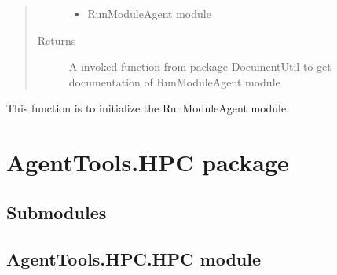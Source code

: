 \documentclass[letterpaper,10pt,english]{sphinxmanual}
\begin{document}
\begin{fulllineitems}
\begin{fulllineitems}
\begin{quote}
\begin{description}
\begin{itemize}
\item {} 
 \textendash{} RunModuleAgent module

\end{itemize}

\item[{Returns}] \leavevmode
A invoked function from package DocumentUtil to get documentation of RunModuleAgent module

\end{description}\end{quote}

\end{fulllineitems}


\end{fulllineitems}


\begin{fulllineitems}
\label{\detokenize{AgentTools.GenericModelAgent:AgentTools.GenericModelAgent.RunModuleAgent.initialize}}
This function is to initialize the RunModuleAgent module

\end{fulllineitems}




\section{AgentTools.HPC package}
\label{\detokenize{AgentTools.HPC:agenttools-hpc-package}}\label{\detokenize{AgentTools.HPC::doc}}

\subsection{Submodules}
\label{\detokenize{AgentTools.HPC:submodules}}

\subsection{AgentTools.HPC.HPC module}
\label{\detokenize{AgentTools.HPC:module-AgentTools.HPC.HPC}}\label{\detokenize{AgentTools.HPC:agenttools-hpc-hpc-module}}
\end{document}
